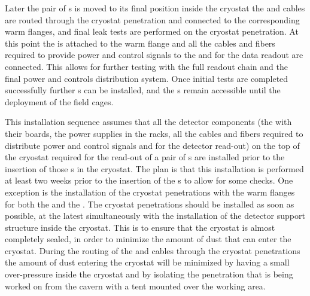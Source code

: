 Later the pair of s is moved to its final position 
inside the cryostat the 
and  cables are routed through the cryostat penetration and
connected to the corresponding warm flanges, and final leak tests are performed
on the cryostat penetration. At this point the  is attached
to the warm flange and all the cables and fibers required to provide 
power and control signals to the  and for the data
readout are connected. This allows for further testing with the full 
 readout chain and the final power and controls distribution
system. Once initial tests are completed successfully further s
can be installed, and the s remain accessible until the 
deployment of the field cages.

This installation sequence assumes that all the  detector 
components (the  with their boards, the power supplies in 
the racks, all the cables and fibers required to distribute power and
control signals and for the detector read-out) on the top of the cryostat 
required for the read-out of a pair of s are installed prior 
to the insertion of those s in the cryostat. The plan is 
that this installation is performed at least two weeks prior to the 
insertion of the s to allow for some checks. One exception
is the installation of the cryostat penetrations with the warm flanges
for both the  and the . The cryostat
penetrations should be installed as soon as possible, at the latest
simultaneously with the installation of the detector support structure
inside the cryostat. This is to ensure that the cryostat is almost 
completely sealed, in order to minimize the amount of dust that can 
enter the cryostat. During the routing of the  and
 cables through the cryostat penetrations the amount
of dust entering the cryostat will be minimized by having a small
over-pressure inside the cryostat and by isolating the penetration
that is being worked on from the cavern with a tent mounted over 
the working area.

